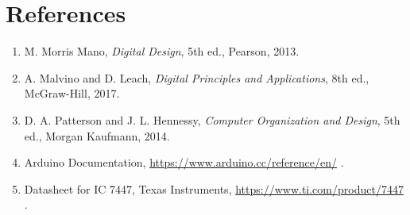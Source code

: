 \section*{References}
\begin{enumerate}
\item M. Morris Mano, \textit{Digital Design}, 5th ed., Pearson, 2013.
\item A. Malvino and D. Leach, \textit{Digital Principles and Applications}, 8th ed., McGraw-Hill, 2017.
\item D. A. Patterson and J. L. Hennessy, \textit{Computer Organization and Design}, 5th ed., Morgan Kaufmann, 2014.
\item Arduino Documentation, \url{https://www.arduino.cc/reference/en/}
.
\item Datasheet for IC 7447, Texas Instruments, \url{https://www.ti.com/product/7447}
.
\end{enumerate}
